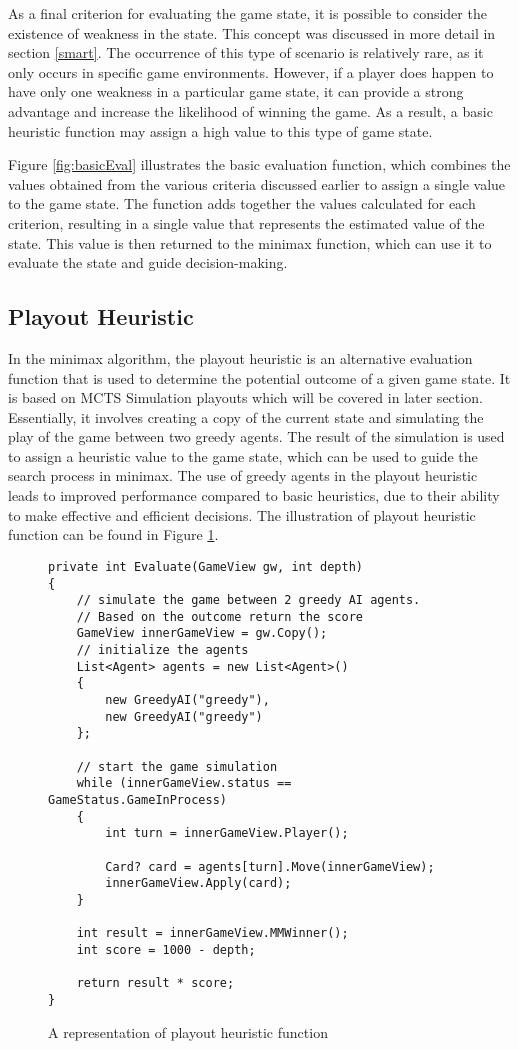 As a final criterion for evaluating the game state, it is possible to consider the existence of weakness in the state. This concept was discussed in more detail in section \ref{smart}. The occurrence of this type of scenario is relatively rare, as it only occurs in specific game environments. However, if a player does happen to have only one weakness in a particular game state, it can provide a strong advantage and increase the likelihood of winning the game. As a result, a basic heuristic function may assign a high value to this type of game state.

Figure \ref{fig:basicEval} illustrates the basic evaluation function, which combines the values obtained from the various criteria discussed earlier to assign a single value to the game state. The function adds together the values calculated for each criterion, resulting in a single value that represents the estimated value of the state. This value is then returned to the minimax function, which can use it to evaluate the state and guide decision-making.

\subsection{Playout Heuristic}

In the minimax algorithm, the playout heuristic is an alternative evaluation function that is used to determine the potential outcome of a given game state. It is based on MCTS Simulation playouts which will be covered in later section. Essentially, it involves creating a copy of the current state and simulating the play of the game between two greedy agents. The result of the simulation is used to assign a heuristic value to the game state, which can be used to guide the search process in minimax. The use of greedy agents in the playout heuristic leads to improved performance compared to basic heuristics, due to their ability to make effective and efficient decisions. The illustration of playout heuristic function can be found in Figure \ref{fig:playoutEval}.

\begin{figure}[h]
\captionsetup{justification=centering}
\begin{lstlisting}
private int Evaluate(GameView gw, int depth)
{
	// simulate the game between 2 greedy AI agents. 
	// Based on the outcome return the score
	GameView innerGameView = gw.Copy();
	// initialize the agents
	List<Agent> agents = new List<Agent>()
	{
		new GreedyAI("greedy"),
		new GreedyAI("greedy")
	};

	// start the game simulation
	while (innerGameView.status == GameStatus.GameInProcess)
	{
		int turn = innerGameView.Player();

		Card? card = agents[turn].Move(innerGameView);
		innerGameView.Apply(card);
	}

	int result = innerGameView.MMWinner();
	int score = 1000 - depth;

	return result * score;
}
\end{lstlisting}
\caption{A representation of playout heuristic function}
\label{fig:playoutEval}
\end{figure}

